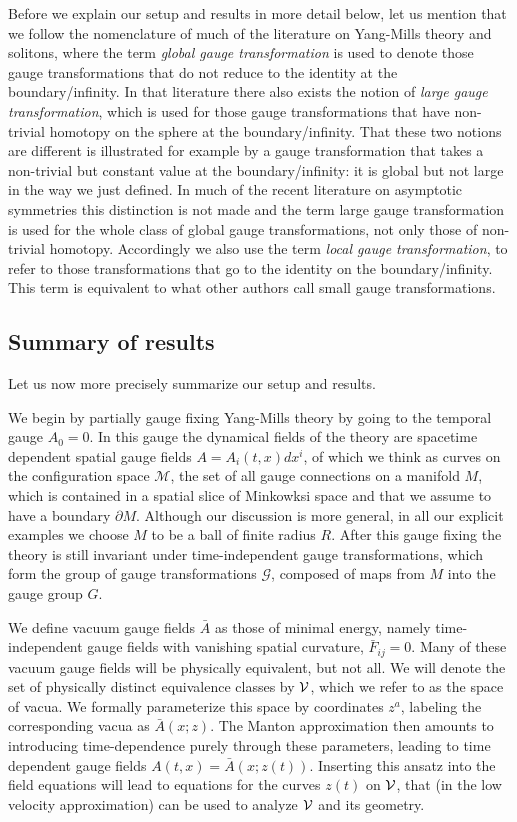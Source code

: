 \documentclass[11pt,a4paper]{article}
\def\calg{{\mathscr G}}
\def\calm{{\mathcal{M}}}
\def\calv{{\cal V}}
\begin{document}
    Before we explain our setup and results in more detail below, let us mention that we follow the nomenclature of much of the literature on Yang-Mills theory and solitons, where the term {\it global gauge transformation} is used to denote those gauge transformations that do not reduce to the identity at the boundary/infinity. In that literature there also exists the notion of {\it large gauge transformation}, which is used for those gauge transformations that have non-trivial homotopy on the sphere at the boundary/infinity. That these two notions are different is illustrated for example by a gauge transformation that takes a non-trivial but constant value at the boundary/infinity: it is global but not large in the way we just defined. In much of the recent literature on asymptotic symmetries this distinction is not made and the term large gauge transformation is used for the whole class of global gauge transformations, not only those of non-trivial homotopy. Accordingly we also use the term {\it local gauge transformation}, to refer to those transformations that go to the identity on the boundary/infinity. This term is equivalent to what other authors call small gauge transformations.
        
    
    
    
    
    
    \subsection{Summary of results}
    Let us now more precisely summarize our setup and results.
    
    We begin by partially gauge fixing Yang-Mills theory by going to the temporal gauge $A_0=0$. In this gauge the dynamical fields of the theory are spacetime dependent spatial gauge fields $A=A_i(t,x)dx^i$, of which we think as curves on the configuration space $\calm$, the set of all gauge connections on a manifold $M$, which is contained in a spatial slice of Minkowksi space and that we assume to have a boundary $\partial M$. Although our discussion is more general, in all our explicit examples we choose $M$ to be a ball of finite radius $R$. After this gauge fixing the theory is still invariant under time-independent gauge transformations, which form the group of gauge transformations $\calg$, composed of maps from $M$ into the gauge group $G$.
    
      We define vacuum gauge fields $\bar A$ as those of minimal energy, namely time-independent gauge fields with vanishing spatial curvature, $\bar F_{ij}=0$. Many of these vacuum gauge fields will be physically equivalent, but not all. We will denote the set of physically distinct equivalence classes by $\calv$, which we refer to as the space of vacua. We formally parameterize this space by coordinates $z^a$, labeling the corresponding vacua as $\bar A(x;z)$. The Manton approximation then amounts to introducing time-dependence purely through these parameters, leading to time dependent gauge fields $A(t,x)=\bar A(x;z(t))$. Inserting this ansatz into the field equations will lead to equations for the curves $z(t)$ on $\calv$, that (in the low velocity approximation) can be used to analyze $\calv$ and its geometry. 
    
\end{document}
